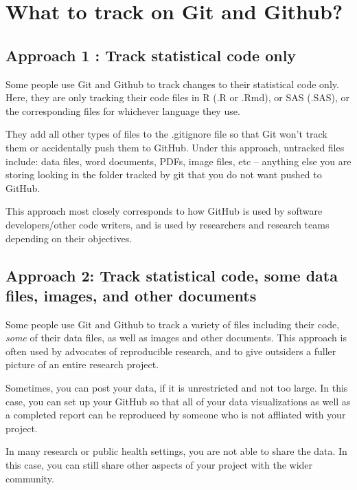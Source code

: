 \documentclass[
]{book}
\begin{document}
\chapter{What to track on Git and Github?}\label{what-to-track-on-git-and-github}

\section{Approach 1 : Track statistical code only}\label{approach-1-track-statistical-code-only}

Some people use Git and Github to track changes to their statistical code only.
Here, they are only tracking their code files in R (.R or .Rmd), or
SAS (.SAS), or the corresponding files for whichever language they use.

They add all other types of files to the .gitignore file so that Git
won't track them or accidentally push them to GitHub. Under this approach,
untracked files include: data files, word documents, PDFs, image files, etc --
anything else you are storing looking in the folder tracked by git that you do
not want pushed to GitHub.

This approach most closely corresponds to how GitHub is used by software
developers/other code writers, and is used by researchers and research
teams depending on their objectives.

\section{Approach 2: Track statistical code, some data files, images, and other documents}\label{approach-2-track-statistical-code-some-data-files-images-and-other-documents}

Some people use Git and Github to track a variety of files including their code,
\emph{some} of their data files, as well as images and other documents. This approach
is often used by advocates of reproducible research, and to give outsiders a
fuller picture of an entire research project.

Sometimes, you can post your data, if it is unrestricted and not too large. In
this case, you can set up your GitHub so that all of your data visualizations
as well as a completed report can be reproduced by someone who is not affliated
with your project.

In many research or public health settings, you are not able to share the data.
In this case, you can still share other aspects of your project with the wider
community.
\end{document}
